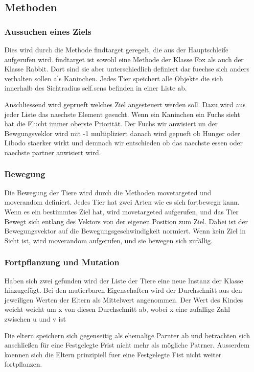 \documentclass[12pt]{article}
\begin{document}
\subsection{Methoden}
\label{methoden}
\subsubsection{Aussuchen eines Ziels}
Dies wird durch die Methode findtarget geregelt, die aus der Hauptschleife aufgerufen wird.
findtarget ist sowohl eine Methode der Klasse Fox als auch der Klasse Rabbit.
Dort sind sie aber unterschiedlich definiert dar fuechse sich anders verhalten sollen als Kaninchen.
Jedes Tier speichert alle Objekte die sich innerhalb des Sichtradius self.sens befinden in einer Liste ab.

Anschliessend wird geprueft welches Ziel angesteuert werden soll.
Dazu wird aus jeder Liste das naechste Element gesucht.
Wenn ein Kaninchen ein Fuchs sieht hat die Flucht immer oberste Priorität.
Der Fuchs wir anwisiert un der Bewgungsveklor wird mit -1 multipliziert
danach wird gepueft ob Hunger oder Libodo staerker wirkt und demnach wir entschieden ob das naechste essen oder naechste partner anwisiert wird.

\subsubsection{Bewegung}
Die Bewegung der Tiere wird durch die Methoden movetargeted und moverandom definiert.
Jedes Tier hat zwei Arten wie es sich fortbewegn kann.
Wenn es ein bestimmtes Ziel hat, wird movetargeted aufgerufen, und das Tier Bewegt sich entlang des Vektors von der eigenen Position zum Ziel.
Dabei ist der Bewegungsvektor auf die Bewegungsgeschwindigkeit normiert.
Wenn kein Ziel in Sicht ist, wird moverandom aufgerufen, und sie bewegen sich zufällig.
\subsubsection{Fortpflanzung und Mutation}
Haben sich zwei gefunden wird der Liste der Tiere eine neue Instanz der Klasse hinzugefügt.
Bei den mutierbaren Eigenschaften wird der Durchschnitt aus den jeweiligen Werten der Eltern als Mittelwert angenommen.
Der Wert des Kindes weicht weicht um x von diesen Durchschnitt ab, wobei x eine zufallige Zahl zwischen u und v ist

Die eltern speichern sich gegenseitig als ehemalige Parnter ab und betrachten sich anschließen für eine Festgelegte Frist nicht mehr als mögliche Patrner. Ausserdem koennen sich die Eltern prinzipiell fuer eine Festgelegte Fist nicht weiter fortpflanzen.
\end{document}
